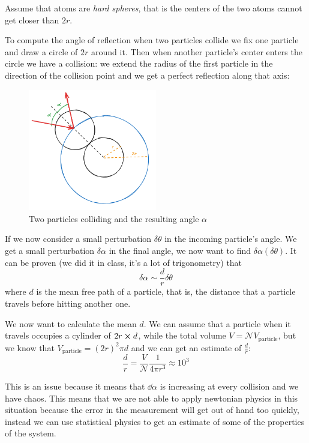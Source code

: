 \documentclass[12pt]{extarticle}
\begin{document}
Assume that atoms are \emph{hard spheres}, that is the centers of the two atoms cannot get closer than $2r$.

To compute the angle of reflection when two particles collide we fix one particle and draw a circle of $2r$ around it.
Then when another particle's center enters the circle we have a collision: we extend the radius of the first particle in the direction of the collision point and we get a perfect reflection along that axis:

\begin{figure}[H]
    \centering
    \includegraphics[width=0.5\textwidth]{assets/S2_P2_PHY1/particle_collision.png}
    \caption{Two particles colliding and the resulting angle $\alpha$}
\end{figure}

If we now consider a small perturbation $\delta \theta$ in the incoming particle's angle.
We get a small perturbation $\delta \alpha$ in the final angle, we now want to find $\delta \alpha(\delta \theta)$.
It can be proven (we did it in class, it's a lot of trigonometry) that
\begin{equation}
    \delta \alpha \sim \frac{d}{r} \delta \theta
\end{equation}
where $d$ is the mean free path of a particle, that is, the distance that a particle travels before hitting another one.

We now want to calculate the mean $d$.
We can assume that a particle when it travels occupies a cylinder of $2r \cross d$, while the total volume $V = \mathscr{N} V_\text{particle}$, but we know that $V_\text{particle} = (2r)^2 \pi d$ and we can get an estimate of $\frac{d}{r}$:
\begin{equation}
    \frac{d}{r} = \frac{V}{\mathscr{N}} \frac{1}{4 \pi r^3} \approx 10^3
\end{equation}

This is an issue because it means that $\dd{\alpha}$ is increasing at every collision and we have chaos.
This means that we are not able to apply newtonian physics in this situation because the error in the measurement will get out of hand too quickly,
instead we can use statistical physics to get an estimate of some of the properties of the system.
\end{document}

